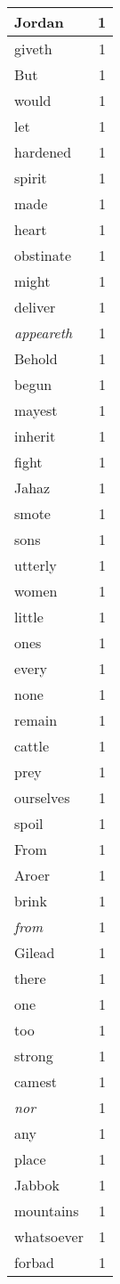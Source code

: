 \begin{center}
\begin{longtable}{l|r}
Jordan & 1 \\ \hline
giveth & 1 \\ \hline
But & 1 \\ \hline
would & 1 \\ \hline
let & 1 \\ \hline
hardened & 1 \\ \hline
spirit & 1 \\ \hline
made & 1 \\ \hline
heart & 1 \\ \hline
obstinate & 1 \\ \hline
might & 1 \\ \hline
deliver & 1 \\ \hline
\emph{appeareth} & 1 \\ \hline
Behold & 1 \\ \hline
begun & 1 \\ \hline
mayest & 1 \\ \hline
inherit & 1 \\ \hline
fight & 1 \\ \hline
Jahaz & 1 \\ \hline
smote & 1 \\ \hline
sons & 1 \\ \hline
utterly & 1 \\ \hline
women & 1 \\ \hline
little & 1 \\ \hline
ones & 1 \\ \hline
every & 1 \\ \hline
none & 1 \\ \hline
remain & 1 \\ \hline
cattle & 1 \\ \hline
prey & 1 \\ \hline
ourselves & 1 \\ \hline
spoil & 1 \\ \hline
From & 1 \\ \hline
Aroer & 1 \\ \hline
brink & 1 \\ \hline
\emph{from} & 1 \\ \hline
Gilead & 1 \\ \hline
there & 1 \\ \hline
one & 1 \\ \hline
too & 1 \\ \hline
strong & 1 \\ \hline
camest & 1 \\ \hline
\emph{nor} & 1 \\ \hline
any & 1 \\ \hline
place & 1 \\ \hline
Jabbok & 1 \\ \hline
mountains & 1 \\ \hline
whatsoever & 1 \\ \hline
forbad & 1 \\ \hline
\end{longtable}
\end{center}



